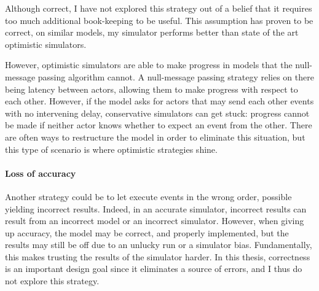 Although correct, I have not explored this strategy out of a belief that it requires too much additional book-keeping to be useful.
This assumption has proven to be correct, on similar models, my simulator performs better than state of the art optimistic simulators.

However, optimistic simulators are able to make progress in models that the null-message passing algorithm cannot.
A null-message passing strategy relies on there being latency between actors, allowing them to make progress with respect to each other.
However, if the model asks for actors that may send each other events with no intervening delay, conservative simulators can get stuck: progress cannot be made if neither actor knows whether to expect an event from the other.
There are often ways to restructure the model in order to eliminate this situation, but this type of scenario is where optimistic strategies shine.

\paragraph{Loss of accuracy}
Another strategy could be to let execute events in the wrong order, possible yielding incorrect results.
Indeed, in an accurate simulator, incorrect results can result from an incorrect model or an incorrect simulator.
However, when giving up accuracy, the model may be correct, and properly implemented, but the results may still be off due to an unlucky run or a simulator bias.
Fundamentally, this makes trusting the results of the simulator harder.
In this thesis, correctness is an important design goal since it eliminates a source of errors, and I thus do not explore this strategy.
